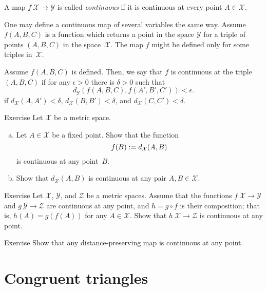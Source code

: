 A map $f\:\mathcal X\to\mathcal Y$ is called \emph{continuous} if it is continuous at every point $A\in \mathcal X$.

One may define a continuous map of several variables the same way.
Assume $f(A,B,C)$ is a function which returns a point in the space $\mathcal Y$ for a triple of points $(A,B,C)$
in the space~$\mathcal X$.
The map $f$ might be defined only for some triples in~$\mathcal X$.

Assume $f(A,B,C)$ is defined.
Then, we say that $f$ is continuous at the triple $(A,B,C)$ 
if for any $\epsilon>0$ there is $\delta>0$ such that 
\[d_{\mathcal Y}(f(A,B,C),f(A',B',C'))<\epsilon.\]
if $d_{\mathcal X}(A,A')<\delta$, $d_{\mathcal X}(B,B')<\delta$, and $d_{\mathcal X}(C,C')<\delta$.


\begin{thm}{Exercise}\label{ex:dist-cont}
Let $\mathcal{X}$ be a metric space.
\begin{enumerate}[(a)]
\item\label{ex:dist-cont:a} Let $A\in \mathcal{X}$ be a fixed point.
Show that the function 
$$f(B):=
d_{\mathcal{X}}(A,B)$$ 
is continuous at any point~$B$.
\item Show that $d_{\mathcal{X}}(A,B)$ is continuous at any pair $A,B\in \mathcal{X}$.
\end{enumerate}

\end{thm}

\begin{thm}{Exercise}\label{ex:comp+cont}
Let $\mathcal{X}$, $\mathcal{Y}$, and $\mathcal{Z}$ be a metric spaces.
Assume that the functions $f\:\mathcal{X}\to\mathcal{Y}$
and $g\:\mathcal{Y}\to\mathcal{Z}$ are continuous at any point,
and $h=g\circ f$ is their composition;
that is, $h(A)=g(f(A))$ for any $A\in \mathcal{X}$.
Show that $h\:\mathcal{X}\to\mathcal{Z}$ is continuous at any point.
\end{thm}

\begin{thm}{Exercise}\label{ex:isom-cont}
Show that any distance-preserving map is continuous at any point.
\end{thm}




\section*{Congruent triangles} 

